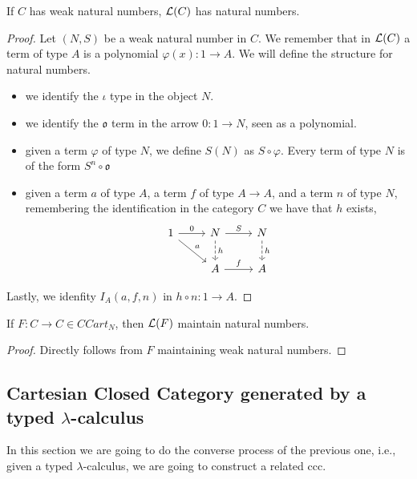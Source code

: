 \begin{definition}
\begin{proposition}\label{natural-numbers}
  If $C$ has weak natural numbers, $\mathcal{L} (C)$ has natural numbers. 
\end{proposition}
\begin{proof}
  Let $(N,S)$ be a weak natural number in $C$. We remember that in $\mathcal{L}(C)$ a term of type $A$ is a polynomial $\varphi(x): 1 \to A$. We will define the structure for natural numbers.
  \begin{itemize}
  \item we identify the $\iota$ type in the object $N$.
  \item we identify the $\mathfrak{o}$ term in the arrow $0: 1 \to N$, seen as a polynomial.
  \item given a term $\varphi$ of type $N$, we define $S(N)$ as $S\circ\varphi$. Every term of type $N$ is of the form $S^n\circ \mathfrak o$
  \item given a term $a$ of type $A$, a term $f$ of type $A\to A$, and a term $n$  of type $N$, remembering the identification in the category $C$ we have that $h$ exists,
      \[
    \begin{tikzcd}
      1\arrow{dr}{a}\arrow{r}{0} & N\arrow{r}{S}\arrow[dashed]{d}{h} & N\arrow[dashed]{d}{h}\\
      & A\arrow{r}{f} & A
    \end{tikzcd}
  \]
\end{itemize}

Lastly, we idenfity $I_A(a,f,n)$ in $h\circ n: 1 \to A$.
  
\end{proof}

\begin{proposition}
  If $F: C\to C \in CCart_N$, then $\mathcal{L} (F)$ maintain natural numbers.
\end{proposition}

\begin{proof}
Directly follows from $F$ maintaining weak natural numbers. 
\end{proof}
  
\subsection{Cartesian Closed Category generated by a typed $\lambda$-calculus}

In this section we are going to do the converse process of the previous one, i.e., given a typed $\lambda$-calculus, we are going to construct a related ccc.


\end{definition}
